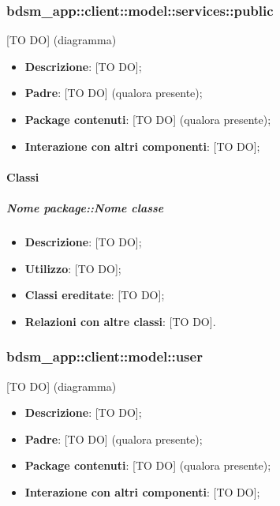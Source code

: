 	\subsubsection{bdsm\_app::client::model::services::public} %
	\label{ssub:bdsm_app_client_model_services_public}
	[TO DO] (diagramma) \newline \newline

	\begin{itemize}
		\item \textbf{Descrizione}: [TO DO];
		\item \textbf{Padre}: [TO DO] (qualora presente);
		\item \textbf{Package contenuti}: [TO DO] (qualora presente);
		\item \textbf{Interazione con altri componenti}: [TO DO];
	\end{itemize}

		\paragraph{Classi} %
			\subparagraph{Nome package::Nome classe} %
			\label{subp:subparagraph_name}
				\begin{itemize}
					\item \textbf{Descrizione}: [TO DO];
					\item \textbf{Utilizzo}: [TO DO];
					\item \textbf{Classi ereditate}: [TO DO];
					\item \textbf{Relazioni con altre classi}: [TO DO].
				\end{itemize}	

	\subsubsection{bdsm\_app::client::model::user} %
	\label{ssub:bdsm_app_client_model_user}
	[TO DO] (diagramma) \newline \newline

	\begin{itemize}
		\item \textbf{Descrizione}: [TO DO];
		\item \textbf{Padre}: [TO DO] (qualora presente);
		\item \textbf{Package contenuti}: [TO DO] (qualora presente);
		\item \textbf{Interazione con altri componenti}: [TO DO];
	\end{itemize}

